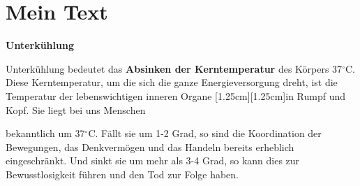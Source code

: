 \documentclass[a4paper,12pt]{scrartcl}
\begin{document}
\newpage
\section{Mein Text}


\begin{center}
  \textbf{Unterkühlung}\\
  \vspace{5mm}
  \parbox{5cm}{
    Unterkühlung bedeutet das \textbf{Absinken der Kerntemperatur} des Körpers
    \raisebox{-1em}{unter} 37$^\circ$C. Diese Kerntemperatur, um die sich
    die ganze \raisebox{1em}{körperinterne} Energieversorgung dreht, ist die
    Temperatur der lebenswichtigen inneren Organe \raisebox{0mm}[1.25cm][1.25cm]{in}
    Rumpf und Kopf. Sie liegt bei uns Menschen
  }
  \hspace{1em}
  \parbox[c]{5cm}{
    bekanntlich um 37$^\circ$C. Fällt sie \raisebox{1em}{nur} um 1-2 Grad, so
    sind die Koordination der Bewegungen, das  Denkvermögen und das
    \raisebox{-1em}{willkürliche} Handeln bereits erheblich eingeschränkt. Und
    sinkt sie um mehr als 3-4 Grad, so kann dies zur Bewusstlosigkeit führen und
    den Tod zur Folge haben.
  }
\end{center}
\end{document}
